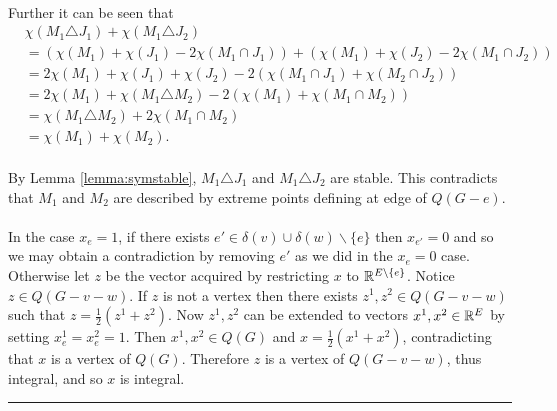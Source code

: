 \documentclass[preprint]{elsarticle}
\newenvironment{proof}{{\bf Proof:  }}{\hfill\rule{2mm}{2mm}}
\begin{document}
\begin{proof}
\paragraph{}
Further it can be seen that
\begin{align*}
&\chi(M_1 \triangle J_1) + \chi(M_1 \triangle J_2)\\
&= (\chi(M_1) + \chi(J_1) - 2\chi(M_1 \cap J_1)) + (\chi(M_1) + \chi(J_2) -2\chi(M_1 \cap J_2))\\
&=2\chi(M_1) + \chi(J_1) + \chi(J_2) -2(\chi(M_1 \cap J_1) + \chi(M_2 \cap J_2)) \\
&= 2\chi(M_1) + \chi(M_1 \triangle M_2) - 2(\chi(M_1) + \chi(M_1 \cap M_2)) \\
&= \chi(M_1 \triangle M_2) + 2\chi(M_1 \cap M_2) \\
&=\chi(M_1) + \chi(M_2).
\end{align*}
\paragraph{}By Lemma \ref{lemma:symstable}, $M_1 \triangle J_1$ and $M_1 \triangle J_2$ are stable. This contradicts that $M_1$ and $M_2$ are described by extreme points defining at edge of $Q(G-e)$.
\paragraph{}
In the case $x_e = 1$, if there exists $e' \in \delta(v) \cup \delta(w) \backslash \{e\}$ then $x_{e'} = 0$ and so we may obtain a contradiction by removing $e'$ as we did in the $x_e = 0$ case. Otherwise let $z$ be the vector acquired by restricting $x$ to $\mathbb{R}^{E \backslash \{e\}}$. Notice $z \in Q(G - v - w)$. If $z$ is not a vertex then there exists $z^1, z^2 \in Q(G-v-w)$ such that $z = \frac{1}{2}(z^1 + z^2)$. Now $z^1,z^2$ can be extended to vectors $x^1, x^2 \in \mathbb{R}^{E}$ by setting $x^1_e=x^2_e = 1$. Then $x^1,x^2 \in Q(G)$ and $x = \frac{1}{2}(x^1 + x^2)$, contradicting that $x$ is a vertex of $Q(G)$. Therefore $z$ is a vertex of $Q(G-v-w)$, thus integral, and so $x$ is integral.
\end{proof}


\end{document}
